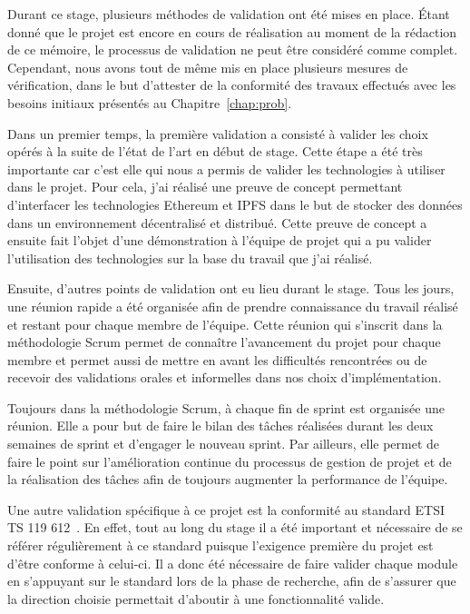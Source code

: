 \documentclass{tnreport}
\begin{document}
Durant ce stage, plusieurs méthodes de validation ont été mises en place. 
Étant donné que le projet est encore en cours de réalisation au moment de la rédaction de ce mémoire, le processus de validation ne peut être considéré comme complet. Cependant, nous avons tout de même mis en place plusieurs mesures de vérification, dans le but d'attester de la conformité des travaux effectués avec les besoins initiaux présentés au Chapitre~\ref{chap:prob}.

Dans un premier temps, la première validation a consisté à valider les choix opérés à la suite de l'état de l'art en début de stage. Cette étape a été très importante car c'est elle qui nous a permis de valider les technologies à utiliser dans le projet. Pour cela, j'ai réalisé une preuve de concept permettant d'interfacer les technologies Ethereum et IPFS dans le but de stocker des données dans un environnement décentralisé et distribué. Cette preuve de concept a ensuite fait l'objet d'une démonstration à l'équipe de projet qui a pu valider l'utilisation des technologies sur la base du travail que j'ai réalisé.

Ensuite, d'autres points de validation ont eu lieu durant le stage. Tous les jours, une réunion rapide a été organisée afin de prendre connaissance du travail réalisé et restant pour chaque membre de l'équipe. Cette réunion qui s'inscrit dans la méthodologie Scrum permet de connaître l'avancement du projet pour chaque membre et permet aussi de mettre en avant les difficultés rencontrées ou de recevoir des validations orales et informelles dans nos choix d'implémentation. 

Toujours dans la méthodologie Scrum, à chaque fin de sprint est organisée une réunion. Elle a pour but de faire le bilan des tâches réalisées durant les deux semaines de sprint et d'engager le nouveau sprint. Par ailleurs, elle permet de faire le point sur l'amélioration continue du processus de gestion de projet et de la réalisation des tâches afin de toujours augmenter la performance de l'équipe. 

Une autre validation spécifique à ce projet est la conformité au standard ETSI TS 119 612~\cite{ETSITS119612}. En effet, tout au long du stage il a été important et nécessaire de se référer régulièrement à ce standard puisque l'exigence première du projet est d'être conforme à celui-ci. Il a donc été nécessaire de faire valider chaque module en s'appuyant sur le standard lors de la phase de recherche, afin de s'assurer que la direction choisie permettait d'aboutir à une fonctionnalité valide.
\end{document}
